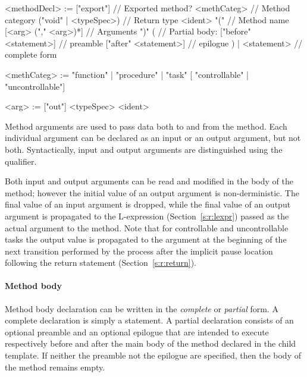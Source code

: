 \begin{bnflisting}
<methodDecl> := ["export"]               // Exported method?
                <methCateg>              // Method category
                ("void" | <typeSpec>)       // Return type
                <ident> "("                 // Method name
                    [<arg> ("," <arg>)*]    // Arguments
                ")"
                    (                       // Partial body:
                     ["before" <statement>] // preamble
                     ["after" <statement>]  // epilogue
                    ) |
                    <statement>             // complete form

<methCateg> := "function"
             | "procedure"
             | "task" [ "controllable" 
                      | "uncontrollable"]

<arg> := ["out"] <typeSpec> <ident>
\end{bnflisting}

Method arguments are used to pass data both to and from the 
method.  Each individual argument can be declared as an input or 
an output argument, but not both.  Syntactically, input and output 
arguments are distinguished using the  qualifier.

Both input and output arguments can be read and modified in the 
body of the method; however the initial value of an output 
argument is non-derministic.  The final value of an input argument 
is dropped, while the final value of an output argument is 
propagated to the L-expression (Section~\ref{s:r:lexpr}) passed as 
the actual argument to the method.  Note that for controllable and 
uncontrollable tasks the output value is propagated to the 
argument at the beginning of the next transition performed by the 
process after the implicit pause location following the return 
statement (Section~\ref{s:r:return}).

\paragraph{Method body}

Method body declaration can be written in the \emph{complete} or 
\emph{partial} form.  A complete declaration is simply a \tsl 
statement.  A partial declaration consists of an optional preamble 
and an optional epilogue that are intended to execute respectively 
before and after the main body of the method declared in the child 
template.  If neither the preamble not the epilogue are specified, 
then the body of the method remains empty.  

